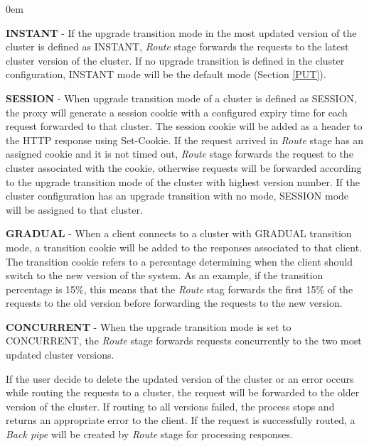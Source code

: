 \documentclass[a4paper,11pt,twoside]{article}
\begin{document}
\begin{list}{-}{}
  \itemsep0em
  \item{\textbf{INSTANT}} - If the upgrade transition mode in the most updated version of the cluster is defined as INSTANT, \textit{Route} stage forwards the requests to the latest cluster version of the cluster. If no upgrade transition is defined in the cluster configuration, INSTANT mode will be the default mode (Section \ref{PUT}).\\
  
  \item{\textbf{SESSION}} -  When upgrade transition mode of a cluster is defined as SESSION, the proxy will generate a  session cookie with a configured expiry time for each request forwarded to that cluster. The session cookie will be added as a header to the HTTP response using  Set-Cookie. If the request arrived in \textit{Route} stage has an assigned cookie and it is not timed out, \textit{Route} stage forwards the request to the cluster associated with the cookie, otherwise requests will be forwarded according to the upgrade transition mode of the cluster with highest version number. If the cluster configuration has an upgrade transition with no mode, SESSION mode will be assigned to that cluster. \\
  
   \item{\textbf{GRADUAL}} - When a client connects to a cluster with GRADUAL transition mode, a transition cookie will be added to the responses associated to that client. The transition cookie refers to a percentage determining when the client should switch to the new version of the system. As an example, if the transition percentage is 15\%, this means that the \textit{Route} stag forwards the first 15\% of the requests to the old version before forwarding the requests to the new version.\\
   
   \item{\textbf{CONCURRENT}} - When the upgrade transition mode is set to CONCURRENT, the \textit{Route} stage forwards requests concurrently to the two most updated cluster versions.        
\end{list}
\noindent
If the user decide to delete the updated version of the cluster or an error occurs while routing the requests to a cluster, the request will be forwarded to the older version of the cluster. If routing to all versions failed, the process stops and returns an appropriate error to the client. If the request is successfully routed, a \textit{Back pipe} will be created by \textit{Route} stage for processing responses.   
\end{document}
